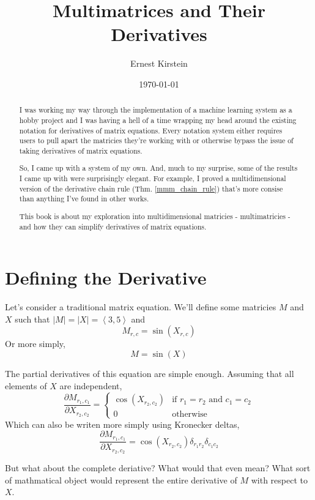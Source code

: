 \documentclass[12pt]{article}
\title{Multimatrices and Their Derivatives}
\author{Ernest Kirstein}
\date{\today}
\theoremstyle{definition}
\theoremstyle{case}
\theoremstyle{ppart}
\begin{document}
\maketitle

\begin{abstract}
I was working my way through the implementation of a machine learning system as
a hobby project and I was having a hell of a time wrapping my head around the
existing notation for derivatives of matrix equations. Every notation system
either requires users to pull apart the matricies they're working with or otherwise
bypass the issue of taking derivatives of matrix equations.

So, I came up with a system of my own. And, much to my surprise, some of the
results I came up with were surprisingly elegant. For example, I proved a
multidimensional version of the derivative chain rule (Thm. \ref{mmm_chain_rule})
that's more consise than anything I've found in other works.

This book is about my exploration into multidimensional matricies - multimatricies -
and how they can simplify derivatives of matrix equations.
\end{abstract}

\section{Defining the Derivative}

Let's consider a traditional matrix equation.
We'll define some matricies $M$ and $X$ such that
$|M| = |X| = \left< 3,5 \right>$
and \[M_{r,c} = \sin(X_{r,c})\]
Or more simply, \[M = \sin(X)\]

\noindent
The partial derivatives of this equation are simple enough. Assuming that all elements
of $X$ are independent,
\[
\frac{\partial M_{r_1,c_1}}{\partial X_{r_2,c_2}} = 
\left\{
	\begin{array}{ll}
		\cos(X_{r_2,c_2})  & \mbox{if } r_1 = r_2 \mbox{ and } c_1 = c_2 \\
		0 & \mbox{otherwise}
	\end{array}
\right.
\]
Which can also be writen more simply using Kronecker deltas,
\[
\frac{\partial M_{r_1,c_1}}{\partial X_{r_2,c_2}} = 
\cos (X_{r_2, c_2}) \delta_{r_1 r_2} \delta_{c_1 c_2}
\]

\noindent
But what about the complete deriative? What would that even mean? What sort of
mathmatical object would represent the entire derivative of $M$ with respect to $X$.
\end{document}
